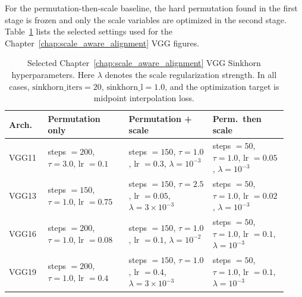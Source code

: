 \documentclass[11pt,a4paper]{report}
\begin{document}
For the permutation-then-scale baseline, the hard permutation found in the first stage is frozen and only the scale variables are optimized in the second stage. Table~\ref{tab:vgg_sinkhorn_repro} lists the selected settings used for the Chapter~\ref{chap:scale_aware_alignment} VGG figures.

\begin{table}[H]
\centering
\small
\begin{tabular}{p{0.13\linewidth}p{0.27\linewidth}p{0.28\linewidth}p{0.25\linewidth}}
\toprule
\textbf{Arch.} & \textbf{Permutation only} & \textbf{Permutation + scale} & \textbf{Perm.\ then scale} \\
\midrule
VGG11 & steps \(=200\), \(\tau=3.0\), lr \(=0.1\) & steps \(=150\), \(\tau=1.0\), lr \(=0.3\), \(\lambda=10^{-3}\) & steps \(=50\), \(\tau=1.0\), lr \(=0.05\), \(\lambda=10^{-3}\) \\
VGG13 & steps \(=150\), \(\tau=1.0\), lr \(=0.75\) & steps \(=150\), \(\tau=2.5\), lr \(=0.05\), \(\lambda=3\times10^{-3}\) & steps \(=50\), \(\tau=1.0\), lr \(=0.02\), \(\lambda=10^{-3}\) \\
VGG16 & steps \(=200\), \(\tau=1.0\), lr \(=0.08\) & steps \(=150\), \(\tau=1.0\), lr \(=0.1\), \(\lambda=10^{-2}\) & steps \(=50\), \(\tau=1.0\), lr \(=0.1\), \(\lambda=10^{-3}\) \\
VGG19 & steps \(=200\), \(\tau=1.0\), lr \(=0.4\) & steps \(=150\), \(\tau=1.0\), lr \(=0.4\), \(\lambda=3\times10^{-3}\) & steps \(=50\), \(\tau=1.0\), lr \(=0.1\), \(\lambda=10^{-3}\) \\
\bottomrule
\end{tabular}
\caption{Selected Chapter~\ref{chap:scale_aware_alignment} VGG Sinkhorn hyperparameters. Here \(\lambda\) denotes the scale regularization strength. In all cases, \(\text{sinkhorn\_iters}=20\), \(\text{sinkhorn\_l}=1.0\), and the optimization target is midpoint interpolation loss.}
\label{tab:vgg_sinkhorn_repro}
\end{table}





\end{document}
